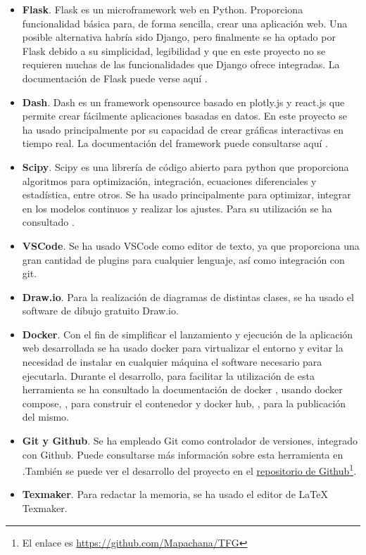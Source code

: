 \begin{itemize}
\item \textbf{Flask}. Flask es un microframework web en Python. Proporciona funcionalidad básica para, de forma sencilla, crear una aplicación web. Una posible alternativa habría sido Django, pero finalmente se ha optado por Flask debido a su simplicidad, legibilidad y que en este proyecto no se requieren muchas de las funcionalidades que Django ofrece integradas. La documentación de Flask puede verse aquí \cite{flask}.
\item \textbf{Dash}. Dash es un framework opensource basado en plotly.js y react.js que permite crear fácilmente aplicaciones basadas en datos. En este proyecto se ha usado principalmente por su capacidad de crear gráficas interactivas en tiempo real. La documentación del framework puede consultarse aquí \cite{dash}.
\item \textbf{Scipy}. Scipy es una librería de código abierto para python que proporciona algoritmos para optimización, integración, ecuaciones diferenciales y estadística, entre otros. Se ha usado principalmente para optimizar, integrar en los modelos continuos y realizar los ajustes. Para su utilización se ha consultado \cite{scipy}.
\item \textbf{VSCode}. Se ha usado VSCode como editor de texto, ya que proporciona una gran cantidad de plugins para cualquier lenguaje, así como integración con git.
\item \textbf{Draw.io}. Para la realización de diagramas de distintas clases, se ha usado el software de dibujo gratuito Draw.io.
\item \textbf{Docker}. Con el fin de simplificar el lanzamiento y ejecución de la aplicación web desarrollada se ha usado docker para virtualizar el entorno y evitar la necesidad de instalar en cualquier máquina el software necesario para ejecutarla. Durante el desarrollo, para facilitar la utilización de esta herramienta se ha consultado la documentación de docker \cite{docker}, usando docker compose, \cite{dockercompose}, para construir el contenedor y docker hub, \cite{dockerhub}, para la publicación del mismo.
\item \textbf{Git y Github}. Se ha empleado Git como controlador de versiones, integrado con Github. Puede consultarse más información sobre esta herramienta en \cite{git}.También se puede ver el desarrollo del proyecto en el \href{https://github.com/Mapachana/TFG}{repositorio de Github}\footnote{El enlace es \href{https://github.com/Mapachana/TFG}{https://github.com/Mapachana/TFG}}.
\item \textbf{Texmaker}. Para redactar la memoria, se ha usado el editor de LaTeX Texmaker.
\end{itemize}

